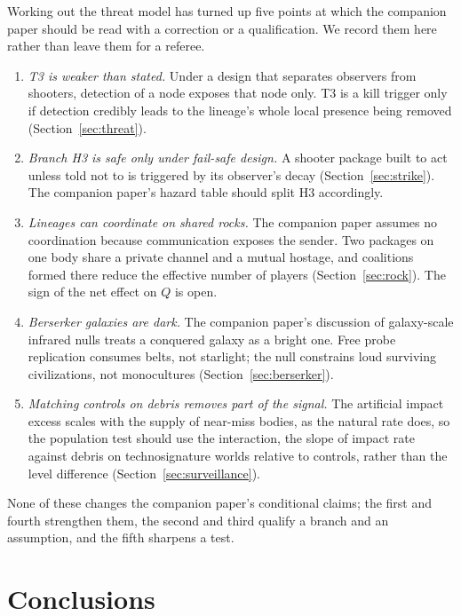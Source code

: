 \documentclass[preprint,12pt]{elsarticle}
\theoremstyle{definition}
\begin{document}
Working out the threat model has turned up five points at which the companion paper \citep{Lopin2026} should be read with a correction or a qualification. We record them here rather than leave them for a referee.
\begin{enumerate}
  \item \emph{T3 is weaker than stated.} Under a design that separates observers from shooters, detection of a node exposes that node only. T3 is a kill trigger only if detection credibly leads to the lineage's whole local presence being removed (Section~\ref{sec:threat}).
  \item \emph{Branch H3 is safe only under fail-safe design.} A shooter package built to act unless told not to is triggered by its observer's decay (Section~\ref{sec:strike}). The companion paper's hazard table should split H3 accordingly.
  \item \emph{Lineages can coordinate on shared rocks.} The companion paper assumes no coordination because communication exposes the sender. Two packages on one body share a private channel and a mutual hostage, and coalitions formed there reduce the effective number of players (Section~\ref{sec:rock}). The sign of the net effect on $Q$ is open.
  \item \emph{Berserker galaxies are dark.} The companion paper's discussion of galaxy-scale infrared nulls treats a conquered galaxy as a bright one. Free probe replication consumes belts, not starlight; the null constrains loud surviving civilizations, not monocultures (Section~\ref{sec:berserker}).
  \item \emph{Matching controls on debris removes part of the signal.} The artificial impact excess scales with the supply of near-miss bodies, as the natural rate does, so the population test should use the interaction, the slope of impact rate against debris on technosignature worlds relative to controls, rather than the level difference (Section~\ref{sec:surveillance}).
\end{enumerate}
None of these changes the companion paper's conditional claims; the first and fourth strengthen them, the second and third qualify a branch and an assumption, and the fifth sharpens a test.

\section{Conclusions}
\label{sec:conclusions}
\end{document}
